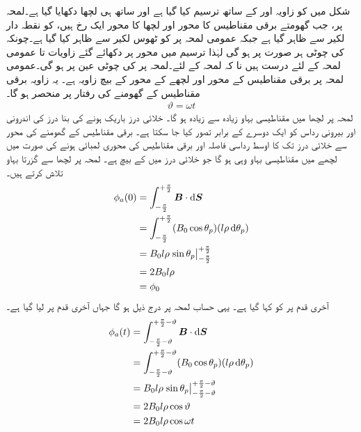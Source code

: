 %
شکل   میں  کو زاویہ  اور   کے ساتھ ترسیم کیا گیا ہے اور ساتھ ہی  لچھا  دکھایا گیا ہے۔لمحہ پر، جب  گھومتے برقی مقناطیس کا محور اور لچھا  کا محور ایک رخ  ہیں،    کو نقطہ دار  لکیر سے ظاہر گیا ہے جبکہ عمومی  لمحہ  پر   کو  ٹھوس لکیر سے   ظاہر کیا گیا ہے۔چونکہ  کی چوٹی ہر صورت  پر ہو گی لہٰذا  ترسیم میں محور  پر دکھائے گئے زاویات  تا  عمومی لمحہ  کے لئے درست  ہیں نا کہ لمحہ  کے لئے۔لمحہ  پر  کی چوٹی عین  پر ہو گی۔عمومی  لمحہ  پر برقی مقناطیس کے محور اور لچھے کے محور کے بیچ  زاویہ ہے۔ یہ زاویہ برقی مقناطیس کے گھومنے کی رفتار  پر منحصر ہو گا۔
\begin{align}
\vartheta=\omega t
\end{align}
لمحہ  پر لچھا  میں   مقناطیسی بہاو زیادہ سے زیادہ ہو گا۔ خلائی درز باریک ہونے کی بنا درز کی اندرونی اور بیرونی رداس کو ایک دوسرے کے برابر تصور کیا جا سکتا ہے۔ برقی مقناطیس کے گھومنے کی محور سے  خلائی درز تک کا اوسط رداسی فاصلہ  اور  برقی مقناطیس کی محوری لمبائی  ہونے کی صورت میں لچھے میں  مقناطیسی بہاو وہی ہو گا جو  خلائی درز میں    کے بیچ ہے۔ لمحہ  پر  لچھا  سے گزرتا بہاو  تلاش کرتے ہیں۔
\begin{gather}
\begin{aligned}\label{مساوات_گھومتے_مشین_قطب_پر_بہاو}
\phi_a(0)&=\int_{-\frac{\pi}{2}}^{+\frac{\pi}{2}} \kvec{B} \cdot \dif \kvec{S}\\
&=\int_{-\frac{\pi}{2}}^{+\frac{\pi}{2}} (B_0 \cos \theta_p)(l \rho \dif \theta_p)\\
&=B_0 l \rho \left. \sin \theta_p \right\vert_{-\frac{\pi}{2}}^{+\frac{\pi}{2}}\\
&=2 B_0 l \rho\\
&=\phi_0
\end{aligned}
\end{gather}
آخری قدم پر   کو  کہا گیا ہے۔ یہی حساب  لمحہ  پر درج ذیل ہو گا جہاں آخری قدم پر  لیا گیا ہے۔
\begin{gather}
\begin{aligned}
\phi_a(t)&=\int_{-\frac{\pi}{2}-\vartheta}^{+\frac{\pi}{2}-\vartheta} \kvec{B} \cdot \dif \kvec{S}\\
&=\int_{-\frac{\pi}{2}-\vartheta}^{+\frac{\pi}{2}-\vartheta} (B_0 \cos \theta_p)(l \rho \dif \theta_p)\\
&=B_0 l \rho \left. \sin \theta_p \right\vert_{-\frac{\pi}{2}-\vartheta}^{+\frac{\pi}{2}-\vartheta}\\
&=2 B_0 l \rho \cos \vartheta\\
&=2 B_0 l \rho \cos \omega t
\end{aligned}
\end{gather}
